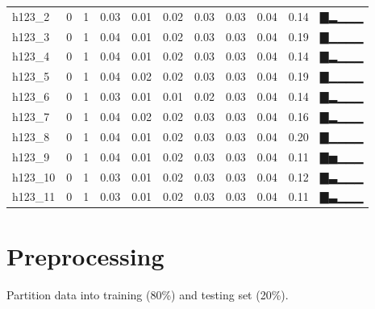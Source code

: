 \documentclass[]{article}
\newenvironment{Shaded}{\begin{snugshade}}{\end{snugshade}}
\newcommand{\CommentTok}[1]{\textcolor[rgb]{0.56,0.35,0.01}{\textit{#1}}}
\newcommand{\DataTypeTok}[1]{\textcolor[rgb]{0.13,0.29,0.53}{#1}}
\newcommand{\FloatTok}[1]{\textcolor[rgb]{0.00,0.00,0.81}{#1}}
\newcommand{\KeywordTok}[1]{\textcolor[rgb]{0.13,0.29,0.53}{\textbf{#1}}}
\newcommand{\NormalTok}[1]{#1}
\begin{document}
\begin{longtable}[]{@{}lrrrrrrrrrl@{}}
h123\_2 & 0 & 1 & 0.03 & 0.01 & 0.02 & 0.03 & 0.03 & 0.04 & 0.14 &
▇▂▁▁▁\tabularnewline
h123\_3 & 0 & 1 & 0.04 & 0.01 & 0.02 & 0.03 & 0.03 & 0.04 & 0.19 &
▇▁▁▁▁\tabularnewline
h123\_4 & 0 & 1 & 0.04 & 0.01 & 0.02 & 0.03 & 0.03 & 0.04 & 0.14 &
▇▂▁▁▁\tabularnewline
h123\_5 & 0 & 1 & 0.04 & 0.02 & 0.02 & 0.03 & 0.03 & 0.04 & 0.19 &
▇▁▁▁▁\tabularnewline
h123\_6 & 0 & 1 & 0.03 & 0.01 & 0.01 & 0.02 & 0.03 & 0.04 & 0.14 &
▇▂▁▁▁\tabularnewline
h123\_7 & 0 & 1 & 0.04 & 0.02 & 0.02 & 0.03 & 0.03 & 0.04 & 0.16 &
▇▂▁▁▁\tabularnewline
h123\_8 & 0 & 1 & 0.04 & 0.01 & 0.02 & 0.03 & 0.03 & 0.04 & 0.20 &
▇▁▁▁▁\tabularnewline
h123\_9 & 0 & 1 & 0.04 & 0.01 & 0.02 & 0.03 & 0.03 & 0.04 & 0.11 &
▇▅▁▁▁\tabularnewline
h123\_10 & 0 & 1 & 0.03 & 0.01 & 0.02 & 0.03 & 0.03 & 0.04 & 0.12 &
▇▃▁▁▁\tabularnewline
h123\_11 & 0 & 1 & 0.03 & 0.01 & 0.02 & 0.03 & 0.03 & 0.04 & 0.11 &
▇▃▁▁▁\tabularnewline
\bottomrule
\end{longtable}

\hypertarget{preprocessing}{%
\section{Preprocessing}\label{preprocessing}}

Partition data into training (80\%) and testing set (20\%).

\begin{Shaded}
\end{Shaded}
\end{document}
